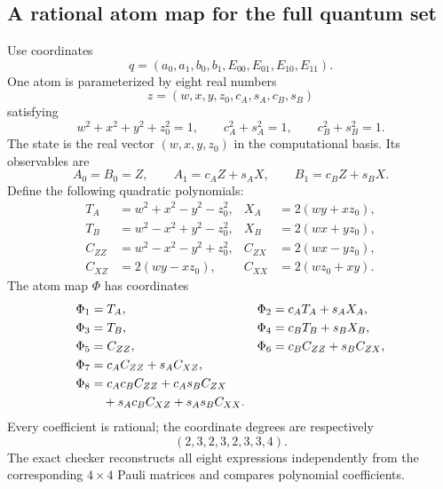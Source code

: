 \subsection{A rational atom map for the full quantum set}
Use coordinates
\[
 q=(a_0,a_1,b_0,b_1,E_{00},E_{01},E_{10},E_{11}).
\]
One atom is parameterized by eight real numbers
\[
 z=(w,x,y,z_0,c_A,s_A,c_B,s_B)
\]
satisfying
\begin{equation}\label{eq:atom-constraints}
 w^2+x^2+y^2+z_0^2=1,\qquad
 c_A^2+s_A^2=1,\qquad c_B^2+s_B^2=1.
\end{equation}
The state is the real vector $(w,x,y,z_0)$ in the computational basis. Its observables are
\[
 A_0=B_0=Z,\qquad A_1=c_AZ+s_AX,\qquad B_1=c_BZ+s_BX.
\]
Define the following quadratic polynomials:
\begin{align*}
 T_A&=w^2+x^2-y^2-z_0^2,&X_A&=2(wy+xz_0),\\
 T_B&=w^2-x^2+y^2-z_0^2,&X_B&=2(wx+yz_0),\\
 C_{ZZ}&=w^2-x^2-y^2+z_0^2,&C_{ZX}&=2(wx-yz_0),\\
 C_{XZ}&=2(wy-xz_0),&C_{XX}&=2(wz_0+xy).
\end{align*}
The atom map $\Phi$ has coordinates
\begin{align}\label{eq:atom-map}
 \Phi_1&=T_A,&\Phi_2&=c_AT_A+s_AX_A,\notag\\
 \Phi_3&=T_B,&\Phi_4&=c_BT_B+s_BX_B,\notag\\
 \Phi_5&=C_{ZZ},&\Phi_6&=c_BC_{ZZ}+s_BC_{ZX},\notag\\
 \Phi_7&=c_AC_{ZZ}+s_AC_{XZ},&&\notag\\
 \Phi_8&=c_Ac_BC_{ZZ}+c_As_BC_{ZX}&&\notag\\
       &\quad+s_Ac_BC_{XZ}+s_As_BC_{XX}.&&
\end{align}
Every coefficient is rational; the coordinate degrees are respectively
\[
 (2,3,2,3,2,3,3,4).
\]
The exact checker reconstructs all eight expressions independently from the corresponding $4\times4$ Pauli matrices and compares polynomial coefficients.

